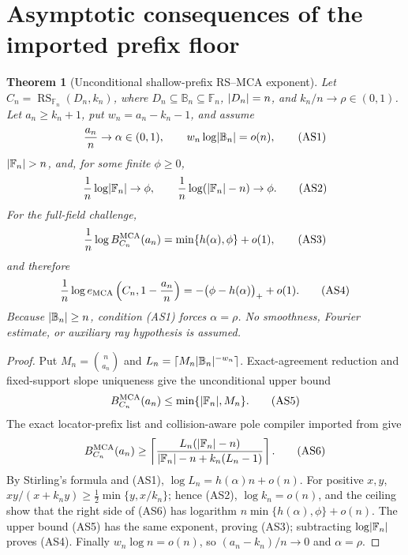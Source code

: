 \documentclass[11pt,a4paper]{amsart}
\numberwithin{equation}{section}
\newtheorem{theorem}{Theorem}[section]
\theoremstyle{remark}
\DeclareMathOperator{\RS}{RS}\DeclareMathOperator{\MCA}{MCA}\DeclareMathOperator{\CA}{CA}
\newcommand{\F}{\mathbb F}\newcommand{\B}{\mathbb B}\newcommand{\K}{\mathbb K}\newcommand{\Z}{\mathbb Z}
\newcommand{\ceil}[1]{\left\lceil #1\right\rceil}\newcommand{\defeq}{\coloneqq}
\begin{document}
\section{Asymptotic consequences of the imported prefix floor}\label{sec:shallow-prefix-exponent}
\begin{theorem}[Unconditional shallow-prefix RS--MCA exponent]
\label{thm:unconditional-asymptotic-rs-mca}
Let \(C_n=\RS_{\F_n}(D_n,k_n)\), where
\(D_n\subseteq\B_n\subseteq\F_n\), \(\lvert D_n\rvert=n\), and
\(k_n/n\to\rho\in(0,1)\).  Let \(a_n\ge k_n+1\), put
\(w_n=a_n-k_n-1\), and assume
\[
 \frac{a_n}{n}\to\alpha\in(0,1),\qquad
 w_n\log\abs{\B_n}=o(n),                           \tag{AS1}
\]
\(\abs{\F_n}>n\), and, for some finite \(\phi\ge0\),
\[
 \frac1n\log\abs{\F_n}\to\phi,
 \qquad
 \frac1n\log(\abs{\F_n}-n)\to\phi.               \tag{AS2}
\]
For the full-field challenge,
\[
 \frac1n\log B_{C_n}^{\rm MCA}(a_n)
   =\min\{h(\alpha),\phi\}+o(1),                   \tag{AS3}
\]
and therefore
\[
 \frac1n\log e_{\rm MCA}
   \left(C_n,1-\frac{a_n}{n}\right)
   =-\bigl(\phi-h(\alpha)\bigr)_++o(1).            \tag{AS4}
\]
Because \(\abs{\B_n}\ge n\), condition \textup{(AS1)} forces
\(\alpha=\rho\).  No smoothness, Fourier estimate, or auxiliary ray
hypothesis is assumed.
\end{theorem}

\begin{proof}
Put \(M_n=\binom n{a_n}\) and
\(L_n=\ceil{M_n\abs{\B_n}^{-w_n}}\).  Exact-agreement reduction and
fixed-support slope uniqueness give the unconditional upper bound
\[
 B_{C_n}^{\rm MCA}(a_n)\le\min\{\abs{\F_n},M_n\}.  \tag{AS5}
\]
The exact locator-prefix list and collision-aware pole compiler imported from \cite[Secs.~14--18]{CAP25v132} give
\[
 B_{C_n}^{\rm MCA}(a_n)\ge
 \left\lceil
 \frac{L_n(\abs{\F_n}-n)}
 {\abs{\F_n}-n+k_n(L_n-1)}
 \right\rceil.                                     \tag{AS6}
\]
By Stirling's formula and \textup{(AS1)},
\(\log L_n=h(\alpha)n+o(n)\).  For positive \(x,y\),
\(xy/(x+k_ny)\ge\frac12\min\{y,x/k_n\}\); hence
\textup{(AS2)}, \(\log k_n=o(n)\), and the ceiling show that the
right side of \textup{(AS6)} has logarithm
\(n\min\{h(\alpha),\phi\}+o(n)\).  The upper bound
\textup{(AS5)} has the same exponent, proving \textup{(AS3)}; subtracting
\(\log\abs{\F_n}\) proves \textup{(AS4)}.  Finally
\(w_n\log n=o(n)\), so \((a_n-k_n)/n\to0\) and
\(\alpha=\rho\).
\end{proof}
\end{document}
